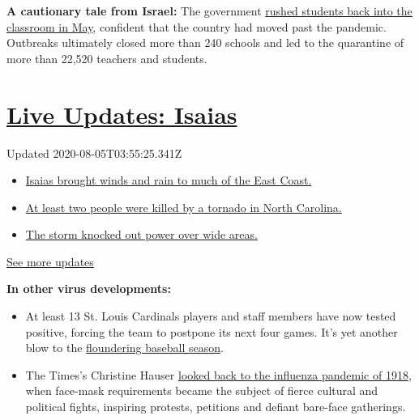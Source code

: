 \textbf{A cautionary tale from Israel:} The government
\href{https://www.nytimes.com/2020/08/04/world/middleeast/coronavirus-israel-schools-reopen.html}{rushed
students back into the classroom in May}, confident that the country had
moved past the pandemic. Outbreaks ultimately closed more than 240
schools and led to the quarantine of more than 22,520 teachers and
students.

\hypertarget{live-updates-isaias}{%
\section{\texorpdfstring{\href{https://www.nytimes.com/2020/08/04/us/isaias-storm-updates.html?action=click\&pgtype=Article\&state=default\&region=MAIN_CONTENT_1\&context=storylines_live_updates}{Live
Updates: Isaias}}{Live Updates: Isaias}}\label{live-updates-isaias}}

Updated 2020-08-05T03:55:25.341Z

\begin{itemize}
\tightlist
\item
  \href{https://www.nytimes.com/2020/08/04/us/isaias-storm-updates.html?action=click\&pgtype=Article\&state=default\&region=MAIN_CONTENT_1\&context=storylines_live_updates\#link-38d68049}{Isaias
  brought winds and rain to much of the East Coast.}
\item
  \href{https://www.nytimes.com/2020/08/04/us/isaias-storm-updates.html?action=click\&pgtype=Article\&state=default\&region=MAIN_CONTENT_1\&context=storylines_live_updates\#link-7961bdbc}{At
  least two people were killed by a tornado in North Carolina.}
\item
  \href{https://www.nytimes.com/2020/08/04/us/isaias-storm-updates.html?action=click\&pgtype=Article\&state=default\&region=MAIN_CONTENT_1\&context=storylines_live_updates\#link-3480f4a1}{The
  storm knocked out power over wide areas.}
\end{itemize}

\href{https://www.nytimes.com/2020/08/04/us/isaias-storm-updates.html?action=click\&pgtype=Article\&state=default\&region=MAIN_CONTENT_1\&context=storylines_live_updates}{See
more updates}

\textbf{In other virus developments:}

\begin{itemize}
\item
  At least 13 St. Louis Cardinals players and staff members have now
  tested positive, forcing the team to postpone its next four games.
  It's yet another blow to the
  \href{https://www.nytimes.com/2020/08/03/sports/baseball/mlb-coronavirus-outbreak.html?action=click\&module=RelatedLinks\&pgtype=Article}{floundering
  baseball season}.
\item
  The Times's Christine Hauser
  \href{https://www.nytimes.com/2020/08/03/us/mask-protests-1918.html}{looked
  back to the influenza pandemic of 1918}, when face-mask requirements
  became the subject of fierce cultural and political fights, inspiring
  protests, petitions and defiant bare-face gatherings.
\end{itemize}

